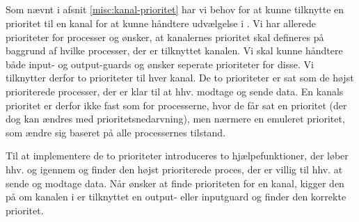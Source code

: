 \subsection{}

Som nævnt i afsnit \cref{misc:kanal-prioritet} har vi behov for at kunne tilknytte en prioritet til en kanal for at kunne håndtere udvælgelse i . Vi har allerede prioriteter for processer og ønsker, at kanalernes prioritet skal defineres på baggrund af hvilke processer, der er tilknyttet kanalen. Vi skal kunne håndtere både input- og output-guards og ønsker seperate prioriteter for disse. Vi tilknytter derfor to prioriteter til hver kanal. De to prioriteter er sat som  de højst prioriterede processer, der er klar til at hhv. modtage og sende data. En kanals prioritet er derfor ikke fast som for processerne, hvor de får sat en prioritet (der dog kan ændres med prioritetsnedarvning), men nærmere en emuleret prioritet, som ændre sig baseret på alle processernes tilstand. 

Til at implementere de to prioriteter introduceres  to hjælpefunktioner, der løber hhv.  og  igennem og  finder den højst prioriterede proces, der er villig til hhv. at sende og modtage data. Når   ønsker at finde prioriteten for en kanal, kigger den på om kanalen i  er tilknyttet en output- eller inputguard og finder den korrekte prioritet.

